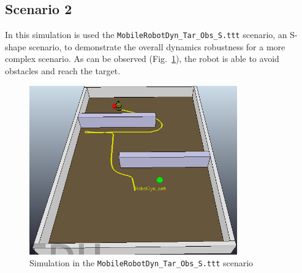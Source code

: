 \subsection{Scenario 2}
In this simulation is used the \texttt{MobileRobotDyn\_Tar\_Obs\_S.ttt}
scenario, an S-shape scenario, to demonstrate the overall dynamics robustness
for a more complex scenario. As can be observed (Fig.~\ref{fig:obs-tar-nonlinear-scenario2}), the robot is able to avoid obstacles and reach the target.

\begin{figure}[htb!]
  \centering
  \includegraphics[width=0.8\textwidth]{img/mapa1.PNG}
  \caption{Simulation in the \texttt{MobileRobotDyn\_Tar\_Obs\_S.ttt} scenario}%
  \label{fig:obs-tar-nonlinear-scenario2}
\end{figure}

